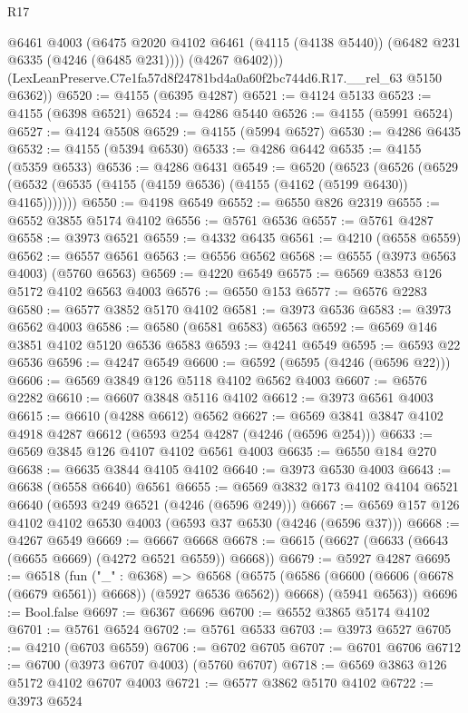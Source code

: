 \begin{lexlean}{R17}
\begin{coremodule}
          @6461
          @4003
          (@6475 @2020 @4102 @6461 (@4115 (@4138 @5440)) (@6482 @231 @6335 (@4246 (@6485 @231))))
          (@4267 @6402)))
      (LexLeanPreserve.C7e1fa57d8f24781bd4a0a60f2bc744d6.R17.__rel_63 @5150 @6362))
@6520 := @4155 (@6395 @4287)
@6521 := @4124 @5133
@6523 := @4155 (@6398 @6521)
@6524 := @4286 @5440
@6526 := @4155 (@5991 @6524)
@6527 := @4124 @5508
@6529 := @4155 (@5994 @6527)
@6530 := @4286 @6435
@6532 := @4155 (@5394 @6530)
@6533 := @4286 @6442
@6535 := @4155 (@5359 @6533)
@6536 := @4286 @6431
@6549 := @6520
    (@6523
      (@6526 (@6529 (@6532 (@6535 (@4155 (@4159 @6536) (@4155 (@4162 (@5199 @6430)) @4165)))))))
@6550 := @4198 @6549
@6552 := @6550 @826 @2319
@6555 := @6552 @3855 @5174 @4102
@6556 := @5761 @6536
@6557 := @5761 @4287
@6558 := @3973 @6521
@6559 := @4332 @6435
@6561 := @4210 (@6558 @6559)
@6562 := @6557 @6561
@6563 := @6556 @6562
@6568 := @6555 (@3973 @6563 @4003) (@5760 @6563)
@6569 := @4220 @6549
@6575 := @6569 @3853 @126 @5172 @4102 @6563 @4003
@6576 := @6550 @153
@6577 := @6576 @2283
@6580 := @6577 @3852 @5170 @4102
@6581 := @3973 @6536
@6583 := @3973 @6562 @4003
@6586 := @6580 (@6581 @6583) @6563
@6592 := @6569 @146 @3851 @4102 @5120 @6536 @6583
@6593 := @4241 @6549
@6595 := @6593 @22 @6536
@6596 := @4247 @6549
@6600 := @6592 (@6595 (@4246 (@6596 @22)))
@6606 := @6569 @3849 @126 @5118 @4102 @6562 @4003
@6607 := @6576 @2282
@6610 := @6607 @3848 @5116 @4102
@6612 := @3973 @6561 @4003
@6615 := @6610 (@4288 @6612) @6562
@6627 := @6569 @3841 @3847 @4102 @4918 @4287 @6612 (@6593 @254 @4287 (@4246 (@6596 @254)))
@6633 := @6569 @3845 @126 @4107 @4102 @6561 @4003
@6635 := @6550 @184 @270
@6638 := @6635 @3844 @4105 @4102
@6640 := @3973 @6530 @4003
@6643 := @6638 (@6558 @6640) @6561
@6655 := @6569 @3832 @173 @4102 @4104 @6521 @6640 (@6593 @249 @6521 (@4246 (@6596 @249)))
@6667 := @6569 @157 @126 @4102 @4102 @6530 @4003 (@6593 @37 @6530 (@4246 (@6596 @37)))
@6668 := @4267 @6549
@6669 := @6667 @6668
@6678 := @6615 (@6627 (@6633 (@6643 (@6655 @6669) (@4272 @6521 @6559)) @6668))
@6679 := @5927 @4287
@6695 := @6518
    (fun ("_" : @6368) =>
    @6568
      (@6575 (@6586 (@6600 (@6606 (@6678 (@6679 @6561)) @6668)) (@5927 @6536 @6562)) @6668)
      (@5941 @6563))
@6696 := Bool.false
@6697 := @6367 @6696
@6700 := @6552 @3865 @5174 @4102
@6701 := @5761 @6524
@6702 := @5761 @6533
@6703 := @3973 @6527
@6705 := @4210 (@6703 @6559)
@6706 := @6702 @6705
@6707 := @6701 @6706
@6712 := @6700 (@3973 @6707 @4003) (@5760 @6707)
@6718 := @6569 @3863 @126 @5172 @4102 @6707 @4003
@6721 := @6577 @3862 @5170 @4102
@6722 := @3973 @6524

\end{coremodule}
\end{lexlean}
